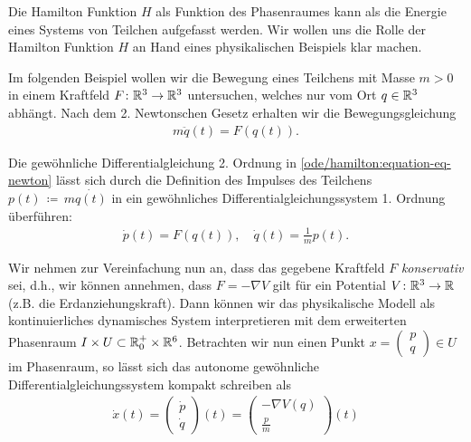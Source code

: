 \par
Die Hamilton Funktion \(H\) als Funktion des Phasenraumes kann als die Energie eines Systems von Teilchen aufgefasst werden.
Wir wollen uns die Rolle der Hamilton Funktion \(H\) an Hand eines physikalischen Beispiels klar machen.
\label{ode/hamilton:example-3}
\begin{example}{}{}



\par
Im folgenden Beispiel wollen wir die Bewegung eines Teilchens mit Masse \(m>0\) in einem Kraftfeld \(F \colon \mathbb{R}^3 \rightarrow \mathbb{R}^3\)  untersuchen, welches nur vom Ort \(q \in \mathbb{R}^3\) abhängt.
Nach dem 2. Newtonschen Gesetz erhalten wir die Bewegungsgleichung
\begin{align}\label{equation:ode/hamilton:eq:newton}
m\ddot{q}(t) = F(q(t)).
\end{align}
\par
Die gewöhnliche Differentialgleichung 2. Ordnung in \cref{ode/hamilton:equation-eq-newton} lässt sich durch die Definition des Impulses des Teilchens \(p(t) \, \coloneqq \, m \dot{q(t)}\) in ein gewöhnliches Differentialgleichungssystem 1. Ordnung überführen:
\begin{align*}
\dot{p}(t) = F(q(t)), \quad \dot{q}(t) = \frac{1}{m}p(t).
\end{align*}
\par
Wir nehmen zur Vereinfachung nun an, dass das gegebene Kraftfeld \(F\) \emph{konservativ} sei, d.h., wir können annehmen, dass \(F = - \nabla V\) gilt für ein Potential \(V \colon \mathbb{R}^3 \rightarrow \mathbb{R}\) (z.B. die Erdanziehungskraft).
Dann können wir das physikalische Modell als kontinuierliches dynamisches System interpretieren mit dem erweiterten Phasenraum \(I \times U \subset \mathbb{R}^+_0 \times \mathbb{R}^6\).
Betrachten wir nun einen Punkt \(x = \begin{pmatrix} p \\ q\end{pmatrix} \in U\) im Phasenraum, so lässt sich das autonome gewöhnliche Differentialgleichungssystem kompakt schreiben als
\begin{align}\label{equation:ode/hamilton:eq:newton_DGL}
\dot{x}(t) = \begin{pmatrix} \dot{p} \\ \dot{q} \end{pmatrix}(t) = \begin{pmatrix} -\nabla V(q) \\ \frac{p}{m} \end{pmatrix}(t)

\end{align}
\end{example}
